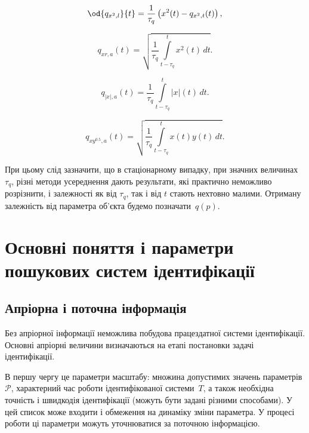 \begin{equation}
\od{q_{x^2,l}}{t}
=
\frac{1}{\tau_q} \left( x^2(t) - q_{x^2,t}(t) \right)
,
\label{atu:eq:qx2l}
\end{equation}

\begin{equation}
  q_{xr,a}(t) =
  \sqrt{
    \frac{1}{\tau_q}
    \int\limits_{t-\tau_q}^{t} x^2(t) \, dt
  }.
  \label{atu:eq:qxra}
\end{equation}

\begin{equation}
  q_{|x|,a}(t) =
  \frac{1}{\tau_q}
  \int\limits_{t-\tau_q}^{t} |x|(t) \, dt
  .
  \label{atu:eq:qxma}
\end{equation}

\begin{equation}
  q_{xy^{0.5},a}(t) =
  \sqrt{
    \frac{1}{\tau_q}
    \int\limits_{t-\tau_q}^{t} x(t)y(t) \, dt
  }
  .
  \label{atu:eq:qxy05a}
\end{equation}

При цьому слід зазначити, що в стаціонарному випадку, при значних
величинах
$ \tau_q $, різні методи усереднення дають результати, які практично неможливо
розрізнити, і залежності як від
$ \tau_q $, так і від
$ t $ стають нехтовно малими. Отриману залежність від
параметра об'єкта будемо позначати~$q(p)$\label{atu:d:q_p}.





\section{Основні поняття і параметри пошукових систем ідентифікації}%

\subsection{Апріорна і поточна інформація}%

Без апріорної інформації неможлива побудова працездатної системи ідентифікації.
Основні апріорні величини визначаються на етапі постановки задачі
ідентифікації.

В першу чергу це параметри масштабу: множина допустимих значень
параметрів \label{atu:d:p_set} \(\mathcal{P} \), характерний час роботи
ідентифікованої системи~$T$,
а також необхідна точність і швидкодія ідентифікації (можуть
бути задані різними способами). У цей список може входити і
обмеження на динаміку зміни параметра. У процесі роботи ці
параметри можуть уточнюватися за поточною інформацією.

